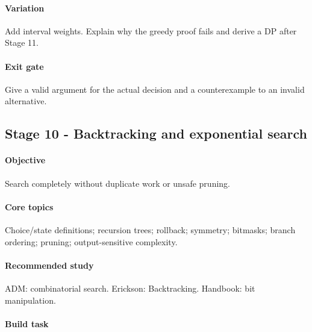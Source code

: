 \documentclass[11pt,letterpaper]{article}
\begin{document}
\paragraph*{Variation}

Add interval weights. Explain why the greedy proof fails and derive a DP after Stage 11.

\paragraph*{Exit gate}

Give a valid argument for the actual decision and a counterexample to an invalid alternative.

\par{}
\begin{samepage}
\section{Stage 10 - Backtracking and exponential search}\label{sec:14}

\label{stage:10}


\paragraph*{Objective}

Search completely without duplicate work or unsafe pruning.

\end{samepage}

\paragraph*{Core topics}

Choice/state definitions; recursion trees; rollback; symmetry; bitmasks; branch ordering; pruning; output-sensitive complexity.

\paragraph*{Recommended study}

ADM: combinatorial search. Erickson: Backtracking. Handbook: bit manipulation.

\paragraph*{Build task}
\end{document}
